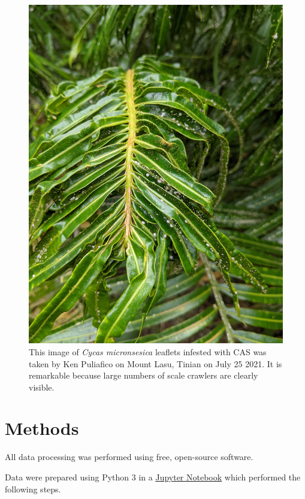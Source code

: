\documentclass[12pt,letterpaper,english,bibliography=totocnumbered, abstract=on]{scrartcl}
\begin{document}
\begin{figure}[h]
	\centering
	\includegraphics[width=1\linewidth]{../images/PXL_20210725_040405506}
	\caption{This image of \textit{Cycas micronsesica} leaflets infested with CAS was taken by Ken Puliafico on Mount Lasu, Tinian on July 25 2021. It is remarkable because large numbers of scale crawlers are clearly visible.}
	\label{fig:crawlers}
\end{figure}

\section{Methods}

All data processing was performed using free, open-source software.

Data were prepared using Python 3 in a \href{https://github.com/aubreymoore/Tinian-cycad-images/blob/main/code/select\_1\_image\_at\_each\_location.ipynb}{Jupyter Notebook} which performed the following steps.
\end{document}

